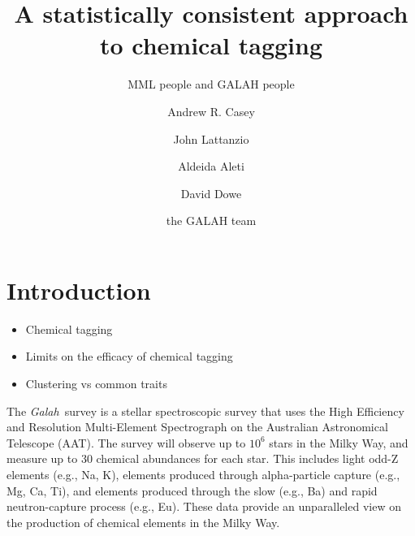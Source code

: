 \documentclass[twocolumn]{aastex61}
\newcommand{\project}[1]{\textsl{#1}}
\newcommand{\Galah}{\project{Galah}}
\begin{document}
\title{A statistically consistent approach to chemical tagging}


\author{MML people and GALAH people}

\author[0000-0003-0174-0564]{Andrew R. Casey}
			 
\author{John Lattanzio}

\author{Aldeida Aleti}

\author{David Dowe}

\author{the GALAH team}


\begin{abstract}
\end{abstract}



\section{Introduction} \label{sec:intro}

\begin{itemize}
	\item Chemical tagging
	\item Limits on the efficacy of chemical tagging
	\item Clustering vs common traits
\end{itemize}


The \Galah\ survey \citep{DaSilva:2015} is a stellar spectroscopic survey 
that uses the High Efficiency and Resolution Multi-Element 
Spectrograph \citep[HERMES][]{Sheinis:2016} on the Australian Astronomical Telescope (AAT).
The survey will observe up to $10^6$ stars in the Milky Way, and
measure up to 30 chemical abundances for each star. This includes
light odd-Z elements (e.g., Na, K), elements produced through
alpha-particle capture (e.g., Mg, Ca, Ti), and elements produced
through the slow (e.g., Ba) and rapid neutron-capture process
(e.g., Eu). These data provide an unparalleled view on the production
of chemical elements in the Milky Way.
\end{document}
